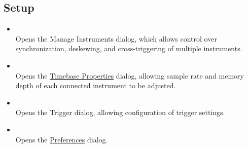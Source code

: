\subsection{Setup}

\begin{itemize}

\item {}\\
Opens the Manage Instruments dialog, which allows control over synchronization, deskewing, and cross-triggering of
multiple instruments.

\item {}\\
Opens the \hyperref[dlg:timebase]{Timebase Properties} dialog, allowing sample rate and memory depth of each connected
instrument to be adjusted.

\item {}\\
Opens the Trigger dialog, allowing configuration of trigger settings.

\item {}\\
Opens the \hyperref[dlg:preferences]{Preferences} dialog.

\end{itemize}

\begin{comment}

\begin{tabularx}{16cm}{llX}
\thickhline
\textbf{Name} & \textbf{Colors} & \textbf{Notes} \\
\thickhline
CRT & \texttt{[image: images/eye-gradient-crt.png]} & Similar to a major vendor's color scheme.\\
Grayscale & \texttt{[image: images/eye-gradient-grayscale.png]} & Common monochrome palette.\\
Ironbow & \texttt{[image: images/eye-gradient-ironbow.png]} & Common "hot metal" palette. \\
KRain & \texttt{[image: images/eye-gradient-krain.png]} & Similar to a major vendor's color scheme.\\
Rainbow & \texttt{[image: images/eye-gradient-rainbow.png]} & Common HSV rainbow palette. \\
Reverse Rainbow & \texttt{[image: images/eye-gradient-reverse-rainbow.png]} & Common HSV rainbow palette. \\
Viridis & \texttt{[image: images/eye-gradient-viridis.png]} & Perceptually uniform palette from matplotlib. \\
\thickhline
\end{tabularx}

\end{comment}

